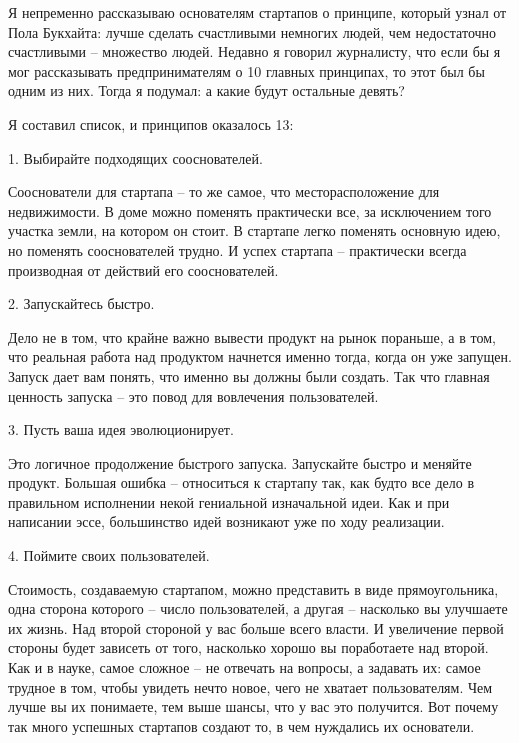 \documentclass[ebook,12pt,oneside,openany]{memoir}
\author{Пол Грэм} \date{}
\begin{document}
\maketitle

Я непременно рассказываю основателям стартапов о принципе, который
узнал от Пола Букхайта: лучше сделать счастливыми немногих людей, чем
недостаточно счастливыми – множество людей. Недавно я говорил
журналисту, что если бы я мог рассказывать предпринимателям о 10
главных принципах, то этот был бы одним из них. Тогда я подумал: а
какие будут остальные девять?

Я составил список, и принципов оказалось 13:

1. Выбирайте подходящих сооснователей.

Сооснователи для стартапа – то же самое, что месторасположение для
недвижимости. В доме можно поменять практически все, за исключением
того участка земли, на котором он стоит. В стартапе легко поменять
основную идею, но поменять сооснователей трудно. И успех стартапа –
практически всегда производная от действий его сооснователей.

2. Запускайтесь быстро.

Дело не в том, что крайне важно вывести продукт на рынок пораньше, а в
том, что реальная работа над продуктом начнется именно тогда, когда он
уже запущен. Запуск дает вам понять, что именно вы должны были
создать. Так что главная ценность запуска – это повод для вовлечения
пользователей.

3. Пусть ваша идея эволюционирует.

Это логичное продолжение быстрого запуска. Запускайте быстро и меняйте
продукт. Большая ошибка – относиться к стартапу так, как будто все
дело в правильном исполнении некой гениальной изначальной идеи. Как и
при написании эссе, большинство идей возникают уже по ходу реализации.

4. Поймите своих пользователей.

Стоимость, создаваемую стартапом, можно представить в виде
прямоугольника, одна сторона которого – число пользователей, а другая
– насколько вы улучшаете их жизнь. Над второй стороной у вас больше
всего власти. И увеличение первой стороны будет зависеть от того,
насколько хорошо вы поработаете над второй. Как и в науке, самое
сложное – не отвечать на вопросы, а задавать их: самое трудное в том,
чтобы увидеть нечто новое, чего не хватает пользователям. Чем лучше вы
их понимаете, тем выше шансы, что у вас это получится. Вот почему так
много успешных стартапов создают то, в чем нуждались их основатели.
\end{document}
